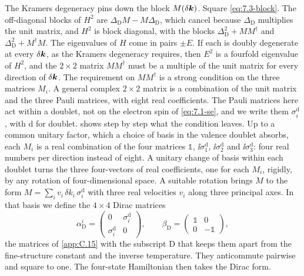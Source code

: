 The Kramers degeneracy pins down the block $M(\delta\bm{k})$. Square \cref{eq:7.3-block}. The off-diagonal blocks of $H^2$ are $\Delta_{\mathrm{D}}M - M\Delta_{\mathrm{D}}$, which cancel because $\Delta_{\mathrm{D}}$ multiplies the unit matrix, and $H^2$ is block diagonal, with the blocks $\Delta_{\mathrm{D}}^2 + MM^\dagger$ and $\Delta_{\mathrm{D}}^2 + M^\dagger M$. The eigenvalues of $H$ come in pairs $\pm E$. If each is doubly degenerate at every $\delta\bm{k}$, as the Kramers degeneracy requires, then $E^2$ is a fourfold eigenvalue of $H^2$, and the $2\times2$ matrix $MM^\dagger$ must be a multiple of the unit matrix for every direction of $\delta\bm{k}$. The requirement on $MM^\dagger$ is a strong condition on the three matrices $M_i$. A general complex $2\times2$ matrix is a combination of the unit matrix and the three Pauli matrices, with eight real coefficients. The Pauli matrices here act within a doublet, not on the electron spin of \cref{eq:7.1-se}, and we write them $\sigma^{\mathrm{d}}_i$, with d for doublet.  shows step by step what the condition leaves. Up to a common unitary factor, which a choice of basis in the valence doublet absorbs, each $M_i$ is a real combination of the four matrices $\mathbb{1}$, $\ii\sigma^{\mathrm{d}}_1$, $\ii\sigma^{\mathrm{d}}_2$ and $\ii\sigma^{\mathrm{d}}_3$: four real numbers per direction instead of eight. A unitary change of basis within each doublet turns the three four-vectors of real coefficients, one for each $M_i$, rigidly, by any rotation of four-dimensional space. A suitable rotation brings $M$ to the form $M = \sum_iv_i\,\delta k_i\,\sigma^{\mathrm{d}}_i$ with three real velocities $v_i$ along three principal axes. In that basis we define the $4\times4$ Dirac matrices
\begin{equation*}
  \alpha_{\mathrm{D}}^i = \begin{pmatrix} 0 & \sigma^{\mathrm{d}}_i \\ \sigma^{\mathrm{d}}_i & 0 \end{pmatrix} , \qquad \beta_{\mathrm{D}} = \begin{pmatrix} \mathbb{1} & 0 \\ 0 & -\mathbb{1} \end{pmatrix} ,
\end{equation*}
the matrices of \cref{app:C.15} with the subscript D that keeps them apart from the fine-structure constant and the inverse temperature. They anticommute pairwise and square to one. The four-state Hamiltonian then takes the Dirac form.
